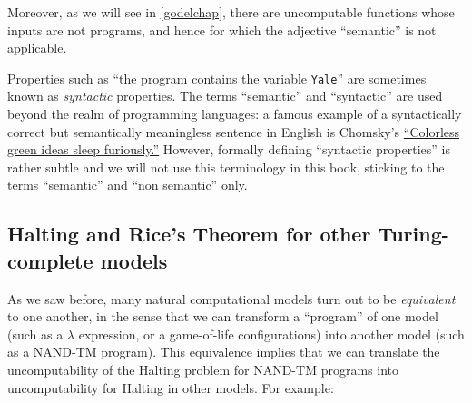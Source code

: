 \begin{remark}
Moreover, as we will see in \cref{godelchap}, there are uncomputable
functions whose inputs are not programs, and hence for which the
adjective ``semantic'' is not applicable.

Properties such as ``the program contains the variable \texttt{Yale}''
are sometimes known as \emph{syntactic} properties. The terms
``semantic'' and ``syntactic'' are used beyond the realm of programming
languages: a famous example of a syntactically correct but semantically
meaningless sentence in English is Chomsky's
\href{https://goo.gl/4gXoiV}{``Colorless green ideas sleep furiously.''}
However, formally defining ``syntactic properties'' is rather subtle and
we will not use this terminology in this book, sticking to the terms
``semantic'' and ``non semantic'' only.

\end{remark}

\subsection{Halting and Rice's Theorem for other Turing-complete
models}\label{Halting-and-Rices-Theorem}

As we saw before, many natural computational models turn out to be
\emph{equivalent} to one another, in the sense that we can transform a
``program'' of one model (such as a \(\lambda\) expression, or a
game-of-life configurations) into another model (such as a NAND-TM
program). This equivalence implies that we can translate the
uncomputability of the Halting problem for NAND-TM programs into
uncomputability for Halting in other models. For example:

\hypertarget{halt-tm}{}


